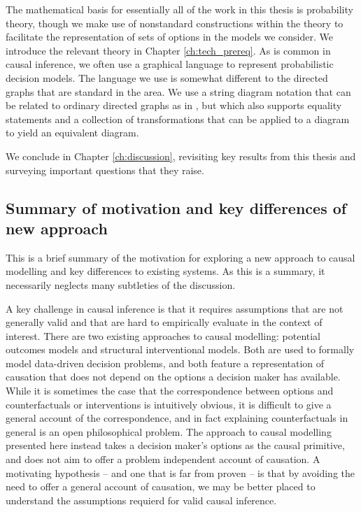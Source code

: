 The mathematical basis for essentially all of the work in this thesis is probability theory, though we make use of nonstandard constructions within the theory to facilitate the representation of sets of options in the models we consider. We introduce the relevant theory in Chapter \ref{ch:tech_prereq}. As is common in causal inference, we often use a graphical language to represent probabilistic decision models. The language we use is somewhat different to the directed graphs that are standard in the area. We use a string diagram notation that can be related to ordinary directed graphs as in \citep{fong_causal_2013}, but which also supports equality statements and a collection of transformations that can be applied to a diagram to yield an equivalent diagram.

We conclude in Chapter \ref{ch:discussion}, revisiting key results from this thesis and surveying important questions that they raise.

\subsection{Summary of motivation and key differences of new approach}

This is a brief summary of the motivation for exploring a new approach to causal modelling and key differences to existing systems. As this is a summary, it necessarily neglects many subtleties of the discussion.

A key challenge in causal inference is that it requires assumptions that are not generally valid and that are hard to empirically evaluate in the context of interest. There are two existing approaches to causal modelling: potential outcomes models and structural interventional models. Both are used to formally model data-driven decision problems, and both feature a representation of causation that does not depend on the options a decision maker has available. While it is sometimes the case that the correspondence between options and counterfactuals or interventions is intuitively obvious, it is difficult to give a general account of the correspondence, and in fact explaining counterfactuals in general is an open philosophical problem. The approach to causal modelling presented here instead takes a decision maker's options as the causal primitive, and does not aim to offer a problem independent account of causation. A motivating hypothesis -- and one that is far from proven -- is that by avoiding the need to offer a general account of causation, we may be better placed to understand the assumptions requierd for valid causal inference.

